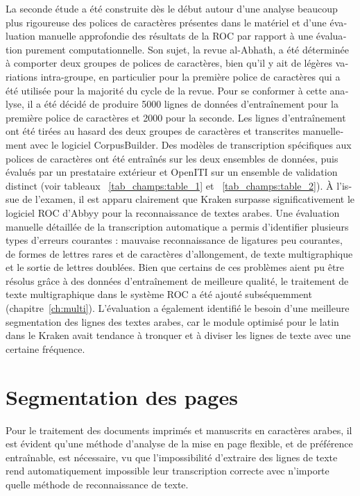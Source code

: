 \begin{french}
La seconde étude a été construite dès le début autour d'une analyse beaucoup
plus rigoureuse des polices de caractères présentes dans le matériel et d'une
évaluation manuelle approfondie des résultats de la ROC par rapport à une
évaluation purement computationnelle. Son sujet, la revue al-Abhath, a été
déterminée à comporter deux groupes de polices de caractères, bien qu'il y ait
de légères variations intra-groupe, en particulier pour la première police de
caractères qui a été utilisée pour la majorité du cycle de la revue. Pour se
conformer à cette analyse, il a été décidé de produire 5000 lignes de données
d'entraînement pour la première police de caractères et 2000 pour la seconde.
Les lignes d'entraînement ont été tirées au hasard des deux groupes de
caractères et transcrites manuellement avec le logiciel CorpusBuilder. Des
modèles de transcription spécifiques aux polices de caractères ont été
entraînés sur les deux ensembles de données, puis évalués par un prestataire
extérieur et OpenITI sur un ensemble de validation distinct (voir tableaux
~\ref{tab_champs:table_1} et ~\ref{tab_champs:table_2}). À l'issue de l'examen,
il est apparu clairement que Kraken surpasse significativement le logiciel ROC
d'Abbyy pour la reconnaissance de textes arabes. Une évaluation manuelle
détaillée de la transcription automatique a permis d'identifier plusieurs types
d'erreurs courantes : mauvaise reconnaissance de ligatures peu courantes, de
formes de lettres rares et de caractères d'allongement, de texte multigraphique
et le sortie de lettres doublées. Bien que certains de ces problèmes aient pu
être résolus grâce à des données d'entraînement de meilleure qualité, le
traitement de texte multigraphique dans le système ROC a été ajouté
subséquemment (chapitre~\ref{ch:multi}). L'évaluation a également identifié le
besoin d'une meilleure segmentation des lignes des textes arabes, car le module
optimisé pour le latin dans le Kraken avait tendance à tronquer et à diviser
les lignes de texte avec une certaine fréquence.

\section{Segmentation des pages}

Pour le traitement des documents imprimés et manuscrits en caractères arabes,
il est évident qu'une méthode d'analyse de la mise en page flexible, et de
préférence entraînable, est nécessaire, vu que l'impossibilité d'extraire des
lignes de texte rend automatiquement impossible leur transcription correcte
avec n'importe quelle méthode de reconnaissance de texte.


\end{french}
